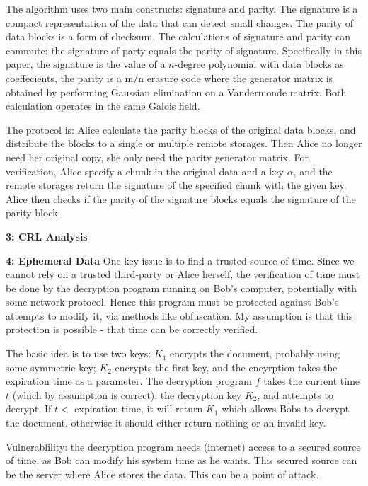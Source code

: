 \documentclass[10pt]{article}
\newcommand\question[2]{\vspace{.1in}\textbf{#1: #2}\vspace{.5em}\vspace{.10in}}
\begin{document}
The algorithm uses two main constructs: signature and parity. The signature is a
compact representation of the data that can detect small changes. The parity of
data blocks is a form of checksum. The calculations of signature and parity can
commute: the signature of party equals the parity of signature. Specifically in
this paper, the signature is the value of a $n$-degree polynomial with data
blocks as coeffecients, the parity is a m/n erasure code where the generator
matrix is obtained by performing Gaussian elimination on a Vandermonde matrix.
Both calculation operates in the same Galois field.

The protocol is: Alice calculate the parity blocks of the original data blocks,
and distribute the blocks to a single or multiple remote storages. Then Alice no
longer need her original copy, she only need the parity generator matrix. For
verification, Alice specify a chunk in the original data and a key $\alpha$, and
the remote storages return the signature of the specified chunk with the given
key. Alice then checks if the parity of the signature blocks equals the
signature of the parity block.


\newpage
\question{3}{CRL Analysis}

\newpage
\question{4}{Ephemeral Data}
One key issue is to find a trusted source of time. Since we cannot rely on a
trusted third-party or Alice herself, the verification of time must be done by
the decryption program running on Bob's computer, potentially with some network
protocol. Hence this program must be protected against Bob's attempts to modify
it, via methods like obfuscation. My assumption is that this protection is
possible - that time can be correctly verified.

The basic idea is to use two keys: $K_1$ encrypts the document, probably
using some symmetric key; $K_2$ encrypts the first key, and the encyrption takes
the expiration time as a parameter. The decryption program $f$ takes the current
time $t$ (which by assumption is correct), the decryption key $K_2$, and
attempts to decrypt. If $t<$ expiration time, it will return $K_1$ which allows
Bobs to decrypt the document, otherwise it should either return nothing or an
invalid key.

Vulnerablility: the decryption program needs (internet) access to a secured
source of time, as Bob can modify his system time as he wants. This secured
source can be the server where Alice stores the data. This can be a point of
attack.
\end{document}
